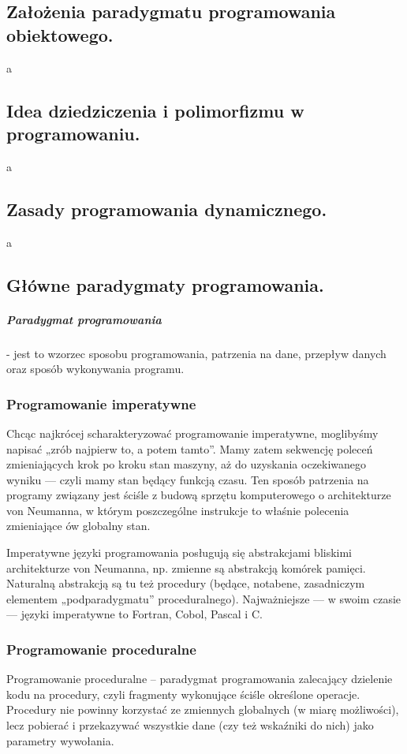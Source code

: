 \documentclass[a4paper,12pt,oneside]{book}
\begin{document}
			\subsection{\color{red}Założenia paradygmatu programowania obiektowego.}
				a
			\newpage\subsection{\color{red}Idea dziedziczenia i polimorfizmu w programowaniu.}
				a
			\newpage\subsection{\color{red}Zasady programowania dynamicznego.}
				a
			\newpage\subsection{Główne paradygmaty programowania.}
				\subparagraph{Paradygmat programowania} - jest to wzorzec sposobu programowania, patrzenia na dane,
				przepływ danych oraz sposób wykonywania programu.
				
				\subsubsection{Programowanie imperatywne}
				Chcąc najkrócej scharakteryzować programowanie imperatywne, moglibyśmy napisać „zrób najpierw to, a potem tamto”. Mamy zatem sekwencję poleceń zmieniających krok po kroku stan maszyny, aż do uzyskania oczekiwanego wyniku — czyli mamy stan będący funkcją czasu. Ten sposób patrzenia na programy związany jest ściśle z budową sprzętu komputerowego o architekturze von Neumanna, w którym poszczególne instrukcje to właśnie polecenia zmieniające ów globalny stan.
				
				Imperatywne języki programowania posługują się abstrakcjami bliskimi architekturze von Neumanna, np. zmienne są abstrakcją komórek pamięci. Naturalną abstrakcją są tu też procedury (będące, notabene, zasadniczym elementem „podparadygmatu” proceduralnego). Najważniejsze — w swoim czasie — języki imperatywne to Fortran, Cobol, Pascal i C.
				
				\subsubsection{Programowanie proceduralne}
				Programowanie proceduralne – paradygmat programowania zalecający dzielenie kodu na procedury, czyli fragmenty wykonujące ściśle określone operacje. Procedury nie powinny korzystać ze zmiennych globalnych (w miarę możliwości), lecz pobierać i przekazywać wszystkie dane (czy też wskaźniki do nich) jako parametry wywołania.
				
\end{document}
